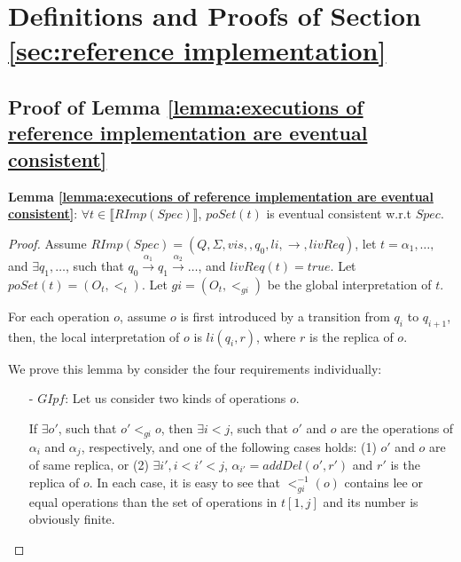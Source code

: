 \forget
{
\section{Definitions and Proofs of Section \ref{sec:reference implementation}}
\label{sec:appendix definitions and proofs of section reference implementation}



\subsection{Proof of Lemma \ref{lemma:executions of reference implementation are eventual consistent}}
\label{subsec:appendix proof of lemma executions of reference implementation are eventual consistent}

{\noindent \bf Lemma \ref{lemma:executions of reference implementation are eventual consistent}}: $\forall t \in \llbracket RImp(Spec) \rrbracket$, $poSet(t)$ is eventual consistent w.r.t $Spec$.

\begin {proof}

Assume $RImp(Spec) = (Q,\Sigma,vis,,q_0,li,\rightarrow,livReq)$, let $t = \alpha_1, \ldots, $ and $\exists q_1,\ldots$, such that $q_0 {\xrightarrow{\alpha_1}} q_1 {\xrightarrow{\alpha_2}} \ldots$, and $livReq(t) = \textit{true}$. Let $poSet(t)=(O_t,<_t)$. Let $gi = (O_t,<_{gi})$ be the global interpretation of $t$.

For each operation $o$, assume $o$ is first introduced by a transition from $q_i$ to $q_{i+1}$, then, the local interpretation of $o$ is $li(q_i,r)$, where $r$ is the replica of $o$.

We prove this lemma by consider the four requirements individually:

\begin{itemize}
\setlength{\itemsep}{0.5pt}
\item[-] $\textit{GIpf}$: Let us consider two kinds of operations $o$.

If $\exists o'$, such that $o' <_{gi} o$, then $\exists i < j$, such that $o'$ and $o$ are the operations of $\alpha_i$ and $\alpha_j$, respectively, and one of the following cases holds: (1) $o'$ and $o$ are of same replica, or (2) $\exists i', i < i' < j$, $\alpha_{i'}=addDel(o',r')$ and $r'$ is the replica of $o$. In each case, it is easy to see that $<^{-1}_{gi}(o)$ contains lee or equal operations than the set of operations in $t[1,j]$ and its number is obviously finite.


\end{itemize}
\end{proof}}
